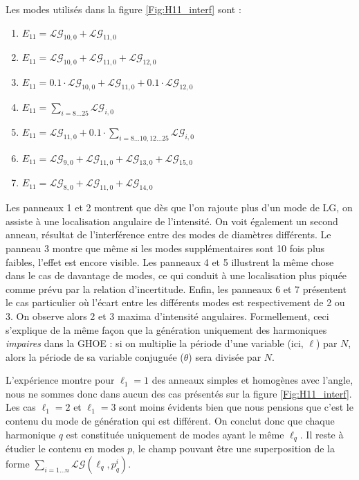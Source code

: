Les modes utilisés dans la figure \ref{Fig:H11_interf} sont :
\begin{enumerate}[1{.}]
\item $E_{11} = \mathcal{LG}_{10,0}+\mathcal{LG}_{11,0}$
\item $E_{11} = \mathcal{LG}_{10,0}+\mathcal{LG}_{11,0}+\mathcal{LG}_{12,0}$
\item $E_{11} = 0.1\cdot\mathcal{LG}_{10,0}+\mathcal{LG}_{11,0}+0.1\cdot\mathcal{LG}_{12,0}$
\item $E_{11} = \sum_{i=8\ldots 25} \mathcal{LG}_{i,0}$
\item $E_{11} = \mathcal{LG}_{11,0}+0.1\cdot\sum_{i=8\ldots10,12\ldots 25} \mathcal{LG}_{i,0}$
\item $E_{11} = \mathcal{LG}_{9,0}+\mathcal{LG}_{11,0}+\mathcal{LG}_{13,0}+\mathcal{LG}_{15,0}$
\item $E_{11} = \mathcal{LG}_{8,0}+\mathcal{LG}_{11,0}+\mathcal{LG}_{14,0}$
\end{enumerate}
Les panneaux 1 et 2 montrent que dès que l'on rajoute plus d'un mode de LG, on assiste à une localisation angulaire de l'intensité. On voit également un second anneau, résultat de l'interférence entre des modes de diamètres différents. Le panneau 3 montre que même si les modes supplémentaires sont 10 fois plus faibles, l'effet est encore visible. Les panneaux 4 et 5 illustrent la même chose dans le cas de davantage de modes, ce qui conduit à une localisation plus piquée comme prévu par la relation d'incertitude. Enfin, les panneaux 6 et 7 présentent le cas particulier où l'écart entre les différents modes est respectivement de 2 ou 3. On observe alors 2 et 3 maxima d'intensité angulaires. Formellement, ceci s'explique de la même façon que la génération uniquement des harmoniques \textit{impaires} dans la GHOE : si on multiplie la période d'une variable (ici, $\ell$) par $N$, alors la période de sa variable conjuguée ($\theta$) sera divisée par $N$.

L'expérience montre pour $\ell_{1} = 1$ des anneaux simples et homogènes avec l'angle, nous ne sommes donc dans aucun des cas présentés sur la figure \ref{Fig:H11_interf}. Les cas $\ell_1=2$ et $\ell_1=3$ sont moins évidents bien que nous pensions que c'est le contenu du mode de génération qui est différent. On conclut donc que chaque harmonique $q$ est constituée uniquement de modes ayant le même $\ell_{q}$. Il reste à étudier le contenu en modes $p$, le champ pouvant être une superposition de la forme $\sum_{i=1\ldots n}\mathcal{LG}(\ell_q,p_q^i)$.

